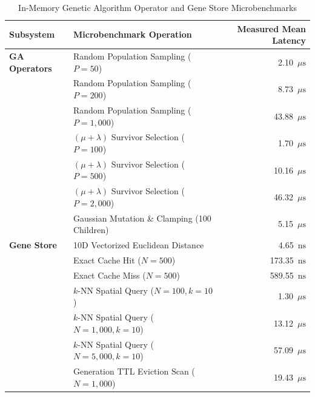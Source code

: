 \begin{table}[t]
\centering
\caption{In-Memory Genetic Algorithm Operator and Gene Store Microbenchmarks}
\label{tab:ga_operators_gene_store}
\begin{tabular}{llr}
\hline
\textbf{Subsystem} & \textbf{Microbenchmark Operation} & \textbf{Measured Mean Latency} \\
\hline
\textbf{GA Operators} & Random Population Sampling ($P=50$) & 2.10~$\mu\text{s}$ \\
& Random Population Sampling ($P=200$) & 8.73~$\mu\text{s}$ \\
& Random Population Sampling ($P=1{,}000$) & 43.88~$\mu\text{s}$ \\
& $(\mu + \lambda)$ Survivor Selection ($P=100$) & 1.70~$\mu\text{s}$ \\
& $(\mu + \lambda)$ Survivor Selection ($P=500$) & 10.16~$\mu\text{s}$ \\
& $(\mu + \lambda)$ Survivor Selection ($P=2{,}000$) & 46.32~$\mu\text{s}$ \\
& Gaussian Mutation \& Clamping (100 Children) & 5.15~$\mu\text{s}$ \\
\hline
\textbf{Gene Store} & 10D Vectorized Euclidean Distance & 4.65~$\text{ns}$ \\
& Exact Cache Hit ($N=500$) & 173.35~$\text{ns}$ \\
& Exact Cache Miss ($N=500$) & 589.55~$\text{ns}$ \\
& $k$-NN Spatial Query ($N=100, k=10$) & 1.30~$\mu\text{s}$ \\
& $k$-NN Spatial Query ($N=1{,}000, k=10$) & 13.12~$\mu\text{s}$ \\
& $k$-NN Spatial Query ($N=5{,}000, k=10$) & 57.09~$\mu\text{s}$ \\
& Generation TTL Eviction Scan ($N=1{,}000$) & 19.43~$\mu\text{s}$ \\
\hline
\end{tabular}
\end{table}
